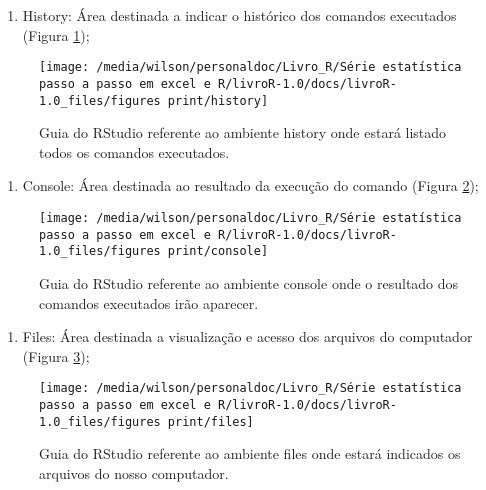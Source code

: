 \documentclass[titlepage, oneside, openany, a4paper]{book}
\providecommand{\tightlist}{%
  \setlength{\itemsep}{0pt}\setlength{\parskip}{0pt}}
\begin{document}
\begin{enumerate}
\def\labelenumi{\arabic{enumi}.}
\setcounter{enumi}{2}
\tightlist
\item
  History: Área destinada a indicar o histórico dos comandos executados (Figura \ref{fig:history});
\end{enumerate}

\begin{figure}

{\centering \texttt{[image: /media/wilson/personaldoc/Livro\_R/Série estatística passo a passo em excel e R/livroR-1.0/docs/livroR-1.0\_files/figures print/history]} 

}

\caption{Guia do RStudio referente ao ambiente history onde estará listado todos os comandos executados.}\label{fig:history}
\end{figure}

\begin{enumerate}
\def\labelenumi{\arabic{enumi}.}
\setcounter{enumi}{3}
\tightlist
\item
  Console: Área destinada ao resultado da execução do comando (Figura \ref{fig:console});
\end{enumerate}

\begin{figure}

{\centering \texttt{[image: /media/wilson/personaldoc/Livro\_R/Série estatística passo a passo em excel e R/livroR-1.0/docs/livroR-1.0\_files/figures print/console]} 

}

\caption{Guia do RStudio referente ao ambiente console onde o resultado dos comandos executados irão aparecer.}\label{fig:console}
\end{figure}

\begin{enumerate}
\def\labelenumi{\arabic{enumi}.}
\setcounter{enumi}{4}
\tightlist
\item
  Files: Área destinada a visualização e acesso dos arquivos do computador (Figura \ref{fig:files});
\end{enumerate}

\begin{figure}

{\centering \texttt{[image: /media/wilson/personaldoc/Livro\_R/Série estatística passo a passo em excel e R/livroR-1.0/docs/livroR-1.0\_files/figures print/files]} 

}

\caption{Guia do RStudio referente ao ambiente files onde estará indicados os arquivos do nosso computador.}\label{fig:files}
\end{figure}
\end{document}

